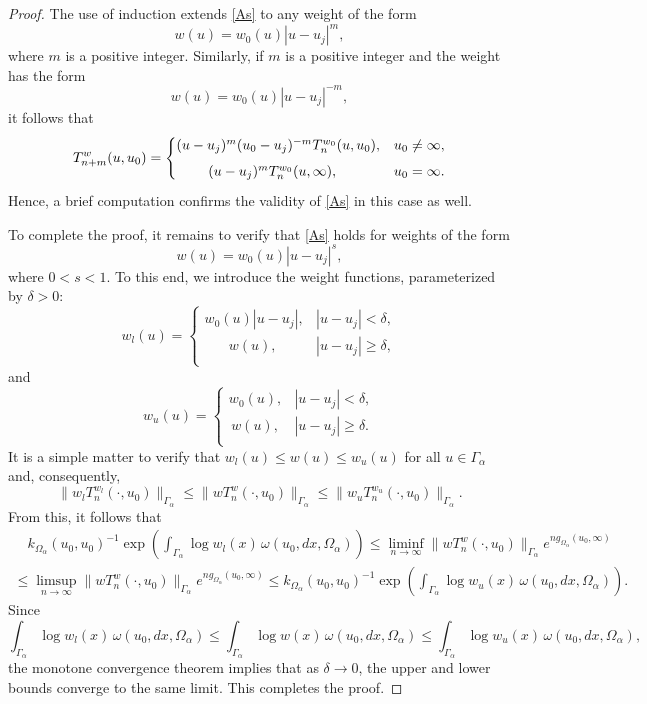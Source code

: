 \documentclass[12pt,oneside,reqno]{amsart}
\theoremstyle{definition}
\numberwithin{equation}{section}
\begin{document}
\begin{proof}
The use of induction extends \eqref{As} to any weight of the form 
	\begin{equation} w(u) = w_0(u)|u-u_j|^m,\end{equation}
	where $m$ is a positive integer. Similarly, if $m$ is a positive integer and the weight has the form
	\[w(u) = w_0(u)|u-u_j|^{-m},\]
	it follows that
	\[T_{n+m}^w(u,u_0) =  \begin{cases}
	(u-u_j)^{m}(u_0-u_j)^{-m}T_{n}^{w_0}(u,u_0),& u_0\neq \infty, \vspace{0.15cm} \\ 
	\qquad \;(u-u_j)^{m}T_{n}^{w_0}(u,\infty), & u_0 = \infty. 
  \end{cases}
\]
	Hence, a brief computation confirms the validity of \eqref{As} in this case as well. 
	
	To complete the proof, it remains to verify that \eqref{As} holds for weights of the form 
	\begin{equation}w(u) = w_0(u)|u-u_j|^s,\end{equation}
	where $0<s<1$. To this end, we introduce the weight functions, parameterized by $\delta>0$:
	\[w_l(u) = \begin{cases}
		w_0(u)|u-u_j|, & |u-u_j|<\delta,\\
		\quad \; \; \, w(u), & |u-u_j|\geq \delta, \\
	\end{cases}\]
	and
	\[w_u(u) = \begin{cases}
		w_0(u), & |u-u_j|<\delta,\\
		\, w(u), & |u-u_j|\geq \delta. \\
	\end{cases}\]
	It is a simple matter to verify that $w_l(u)\leq w(u)\leq w_u(u)$ for all $u\in \Gamma_\alpha$ and, consequently, 
	\[\|w_l T_n^{w_l}(\cdot,u_0)\|_{\Gamma_\alpha}\leq\|w T_n^{w}(\cdot,u_0)\|_{\Gamma_\alpha}\leq\|w_u T_n^{w_u}(\cdot,u_0)\|_{\Gamma_\alpha}.\]
	From this, it follows that
	\begin{multline*}
		\quad k_{\Omega_\alpha}(u_0,u_0)^{-1}
		\exp\left(\int_{\Gamma_\alpha}\log w_l(x)\,\omega(u_0,dx,\Omega_{\alpha})\right)
		\leq \liminf_{n\rightarrow\infty}
		\|w T_n^{w}(\cdot,u_0)\|_{\Gamma_{\alpha}}e^{ng_{\Omega_\alpha}(u_0,\infty)} \\
	        \leq\limsup_{n\rightarrow\infty}
	        \|w T_n^{w}(\cdot,u_0)\|_{\Gamma_{\alpha}}e^{ng_{\Omega_\alpha}(u_0,\infty)}
	        \leq k_{\Omega_\alpha}(u_0,u_0)^{-1}
	        \exp\left(\int_{\Gamma_\alpha}\log w_u(x)\,\omega(u_0,dx,\Omega_{\alpha})\right). \quad
	\end{multline*}
	Since
	\[
	\int_{\Gamma_\alpha}\log w_l(x)\,\omega(u_0,dx,\Omega_{\alpha})
	\leq \int_{\Gamma_\alpha}\log w(x)\,\omega(u_0,dx,\Omega_{\alpha})
	\leq \int_{\Gamma_\alpha}\log w_u(x)\,\omega(u_0,dx,\Omega_{\alpha}),	
	\]
	the monotone convergence theorem implies that as $\delta\rightarrow 0$, the upper and lower bounds %
	converge to the same limit. This completes the proof.
\end{proof}
\end{document}
